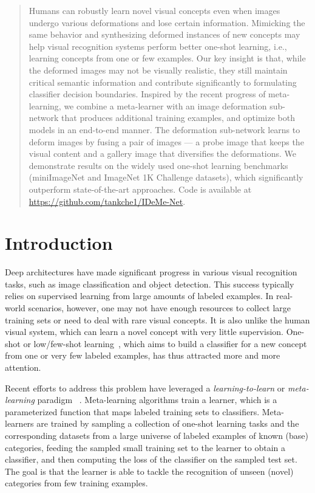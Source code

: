 \documentclass[10pt,letterpaper,twocolumn]{article}
\begin{document}
\begin{abstract}
Humans can robustly learn novel visual concepts even when images undergo various deformations and lose certain information. Mimicking the same behavior and synthesizing deformed instances of new concepts may help
visual recognition systems perform better one-shot learning, i.e.,
learning concepts from one or few examples. Our key insight is that,
while the deformed images may not be visually realistic, they still
maintain critical semantic information and contribute significantly
to formulating classifier decision boundaries. Inspired by the recent
progress of meta-learning, we combine a meta-learner with an image
deformation sub-network that produces additional training examples,
and optimize both models in an end-to-end manner. The deformation
sub-network learns to deform images by fusing a pair of images
--- a probe image that keeps the visual content and a gallery image
that diversifies the deformations. We demonstrate results on the widely
used one-shot learning benchmarks (miniImageNet and ImageNet
1K Challenge datasets), which significantly outperform state-of-the-art approaches. Code is available at \url{https://github.com/tankche1/IDeMe-Net}.

\end{abstract}

\vspace{-.7cm}
 
\section{Introduction}
Deep architectures have made significant progress in various visual
recognition tasks, such as image classification and object detection.
This success typically relies on supervised learning from large amounts
of labeled examples. In real-world scenarios, however, one may not
have enough resources to collect large training sets or need to deal
with rare visual concepts. It is also unlike the human visual system,
which can learn a novel concept with very little supervision.
One-shot or low/few-shot learning~\cite{feifei2006one_shot}, which aims to build a classifier for a new concept from
one or very few labeled examples, has thus attracted more and more
attention.

Recent efforts to address this problem have leveraged a \emph{learning-to-learn}
or \emph{meta-learning} paradigm ~\cite{Thrun1998,schmidhuber1987evolutionary,matchingnet_1shot,yuxiong2016NeurIPS,wang2016learningfrom,prototype_network,wang2017learning,Sachin2017,MAML,meta-sgd}.
Meta-learning algorithms train a learner, which is a parameterized function that maps labeled training
sets to classifiers. Meta-learners are trained by sampling a collection
of one-shot learning tasks and the corresponding datasets from a large
universe of labeled examples of known (base) categories, feeding the
sampled small training set to the learner to obtain a classifier,
and then computing the loss of the classifier on the sampled test
set. The goal is that the learner is able to tackle the recognition
of unseen (novel) categories from few training examples.
\end{document}
